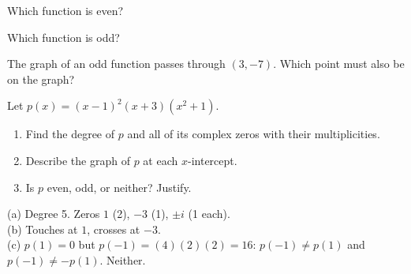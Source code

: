 \begin{exo}{}
Which function is even?
\end{exo}
\begin{exo}{}
Which function is odd?
\end{exo}
\begin{exo}{}
The graph of an odd function passes through $(3,-7)$. Which point must also be on the graph?
\end{exo}
\begin{exo}{}
Let $p(x)=(x-1)^2(x+3)(x^2+1)$.
\begin{enumerate}[label=(\alph*)]
\item Find the degree of $p$ and all of its complex zeros with their multiplicities.
\item Describe the graph of $p$ at each $x$-intercept.
\item Is $p$ even, odd, or neither? Justify.
\end{enumerate}
\begin{solution}
(a) Degree 5. Zeros $1$ (2), $-3$ (1), $\pm i$ (1 each).\\
(b) Touches at $1$, crosses at $-3$.\\
(c) $p(1)=0$ but $p(-1)=(4)(2)(2)=16$: $p(-1)\neq p(1)$ and $p(-1)\neq-p(1)$. Neither.
\end{solution}
\end{exo}

